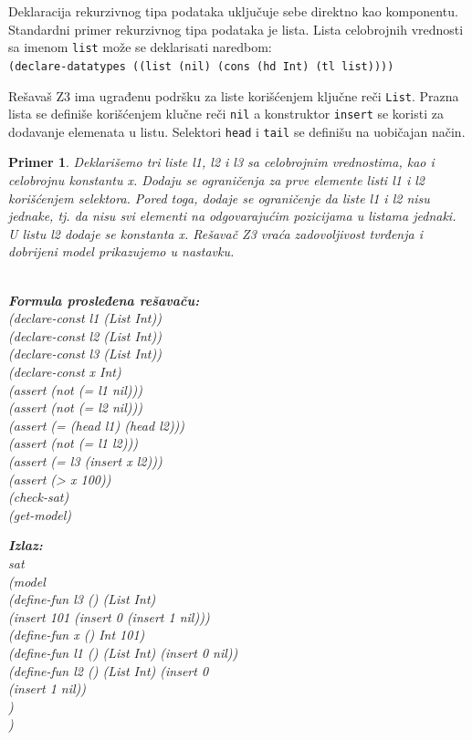 \documentclass[12pt,oneside]{memoir}
\newcommand\tab[1][0.5cm]{\hspace*{#1}}
\newtheorem{primer}{Primer}
\begin{document}
Deklaracija rekurzivnog tipa podataka uključuje sebe direktno kao komponentu. Standardni primer rekurzivnog tipa podataka je lista. 
Lista celobrojnih vrednosti sa imenom \texttt{list} može se deklarisati naredbom:\\
\texttt{(declare-datatypes ((list (nil) (cons (hd Int) (tl list))))}
\par
Rešavaš Z3 ima ugrađenu podršku za liste korišćenjem ključne reči \texttt{List}.
Prazna lista se definiše korišćenjem klučne reči \texttt{nil} a konstruktor \texttt{insert} se koristi za dodavanje elemenata u listu. Selektori \texttt{head} i \texttt{tail} se definišu na uobičajan način.

\begin{primer} Deklarišemo tri liste l1, l2 i l3 sa celobrojnim vrednostima, kao i celobrojnu konstantu x. Dodaju se ograničenja za prve elemente listi l1 i l2 korišćenjem selektora. Pored toga, dodaje se ograničenje da liste l1 i l2 nisu jednake, tj. da nisu svi elementi na odgovarajućim pozicijama u listama jednaki. U listu l2 dodaje se konstanta x. Rešavač Z3 vraća zadovoljivost tvrđenja i dobrijeni model prikazujemo u nastavku.
\\ \\
\begin{minipage}[b]{0.42\textwidth}
\textbf{Formula prosleđena rešavaču:}
\\(declare-const l1 (List Int))
\\(declare-const l2 (List Int))
\\(declare-const l3 (List Int))
\\(declare-const x Int)
\\(assert (not (= l1 nil)))
\\(assert (not (= l2 nil)))
\\(assert (= (head l1) (head l2)))
\\(assert (not (= l1 l2)))
\\(assert (= l3 (insert x l2)))
\\(assert (> x 100))
\\(check-sat)
\\(get-model)
\end{minipage}
\hspace{0.9cm}
\begin{minipage}[t]{0.55\textwidth}
\vspace{-7.84cm}
\textbf{Izlaz:}
\\sat 
\\(model 
\\\tab(define-fun l3 () (List Int) 
\\\tab(insert 101 (insert 0 (insert 1 nil)))
\\\tab(define-fun x () Int 101) 
\\\tab(define-fun l1 () (List Int) (insert 0 nil)) 
\\\tab(define-fun l2 () (List Int) (insert 0 
\\\tab\tab(insert 1 nil))
\\\tab)
\\) 
\end{minipage}


\end{primer}
\end{document}
